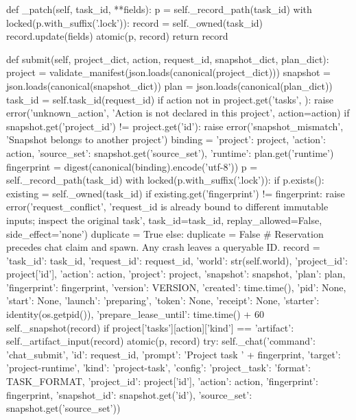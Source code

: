     def _patch(self, task_id, **fields):
        p = self._record_path(task_id)
        with locked(p.with_suffix('.lock')):
            record = self._owned(task_id)
            record.update(fields)
            atomic(p, record)
            return record

    def submit(self, project_dict, action, request_id, snapshot_dict, plan_dict):
        project = validate_manifest(json.loads(canonical(project_dict)))
        snapshot = json.loads(canonical(snapshot_dict))
        plan = json.loads(canonical(plan_dict))
        task_id = self.task_id(request_id)
        if action not in project.get('tasks', {}):
            raise error('unknown_action', 'Action is not declared in this project', action=action)
        if snapshot.get('project_id') != project.get('id'):
            raise error('snapshot_mismatch', 'Snapshot belongs to another project')
        binding = {'project': project, 'action': action,
                   'source_set': snapshot.get('source_set'), 'runtime': plan.get('runtime')}
        fingerprint = digest(canonical(binding).encode('utf-8'))
        p = self._record_path(task_id)
        with locked(p.with_suffix('.lock')):
            if p.exists():
                existing = self._owned(task_id)
                if existing.get('fingerprint') != fingerprint:
                    raise error('request_conflict', 'request_id is already bound to different immutable inputs; inspect the original task',
                                task_id=task_id, replay_allowed=False, side_effect='none')
                duplicate = True
            else:
                duplicate = False
                # Reservation precedes chat claim and spawn. Any crash leaves a queryable ID.
                record = {'task_id': task_id, 'request_id': request_id, 'world': str(self.world),
                          'project_id': project['id'], 'action': action, 'project': project,
                          'snapshot': snapshot, 'plan': plan, 'fingerprint': fingerprint,
                          'version': VERSION, 'created': time.time(), 'pid': None, 'start': None,
                          'launch': 'preparing', 'token': None, 'receipt': None,
                          'starter': identity(os.getpid()), 'prepare_lease_until': time.time() + 60}
                self._snapshot(record)
                if project['tasks'][action]['kind'] == 'artifact':
                    self._artifact_input(record)
                atomic(p, record)
                try:
                    self._chat({'command': 'chat_submit', 'id': request_id, 'prompt': 'Project task ' + fingerprint,
                                'target': 'project-runtime', 'kind': 'project-task',
                                'config': {'project_task': {'format': TASK_FORMAT, 'project_id': project['id'],
                                                          'action': action, 'fingerprint': fingerprint,
                                                          'snapshot_id': snapshot.get('id'), 'source_set': snapshot.get('source_set')}}})
